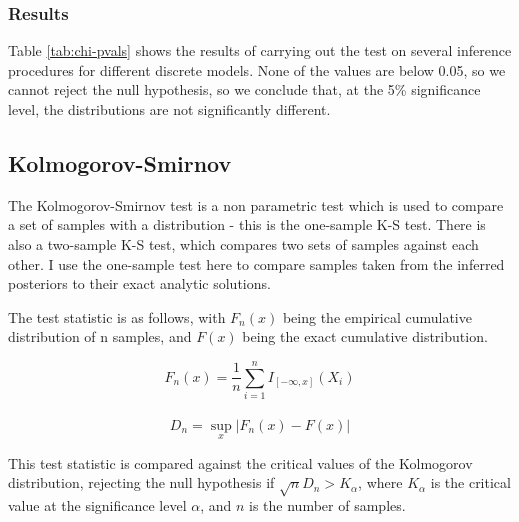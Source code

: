 \subsubsection{Results}
\begin{table}[!ht]
	\centering
	\caption{p-values of $\chi^2$ test on different models using different inference procedures}
	\label{tab:chi-pvals}
\end{table}

Table \ref{tab:chi-pvals} shows the results of carrying out the test on several inference procedures for different discrete models. None of the values are below 0.05, so we cannot reject the null hypothesis, so we conclude that, at the 5\% significance level, the distributions are not significantly different.

\subsection{Kolmogorov-Smirnov}

The Kolmogorov-Smirnov test is a non parametric test which is used to compare a set of samples with a distribution - this is the one-sample K-S test. There is also a two-sample K-S test, which compares two sets of samples against each other. I use the one-sample test here to compare samples taken from the inferred posteriors to their exact analytic solutions.

The test statistic is as follows, with $F_n(x)$ being the empirical cumulative distribution of n samples, and $F(x)$ being the exact cumulative distribution.

$$F_{n}(x)=\frac{1}{n}\sum_{i=1}^{n}I_{[-\infty ,x]}(X_{i})$$\\
$$D_{n}=\sup_{x}|F_{n}(x)-F(x)|$$

This test statistic is compared against the critical values of the Kolmogorov distribution, rejecting the null hypothesis if $\sqrt{n}D_n > K_\alpha$, where $K_\alpha$ is the critical value at the significance level $\alpha$, and $n$ is the number of samples.

